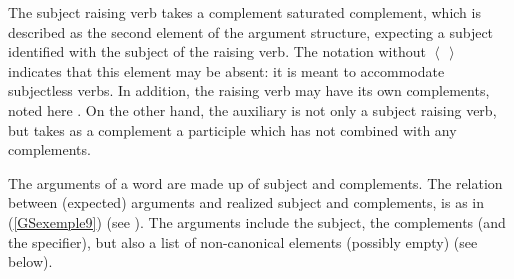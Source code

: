 \documentclass[output=paper
                ,modfonts
                ,nonflat
	        ,collection
	        ,collectionchapter
	        ,collectiontoclongg
 	        ,biblatex
                ,babelshorthands
                ,newtxmath
                ,draftmode
                ,colorlinks, citecolor=brown
]{./langsci/langscibook}
\begin{document}
{\begin{exe}
	\ex 	\label{GSexemple8}
	\begin{xlist}
	
	\end{xlist}
\end{exe}

The subject raising verb takes a complement saturated complement, which is described as the second element of the argument structure, expecting a subject  identified with the subject of the raising verb. The notation  without $\left< \, \right>$ indicates that this element may be absent: it is meant to accommodate subjectless verbs. In addition, the raising verb may have its own complements, noted here . On the other hand, the auxiliary is not only a subject raising verb, but takes as a complement a participle which has not combined with any complements.

The arguments of a word are made up of subject and complements. The relation between (expected) arguments and realized subject and complements, is as in (\ref{GSexemple9}) (see \citealt{ginzburg2000interrogative, bouma2001satisfying}). The arguments include the subject, the complements (and the specifier), but also a list of non-canonical elements (possibly empty) (see below).

\begin{exe}
\end{exe}

}
\end{document}
